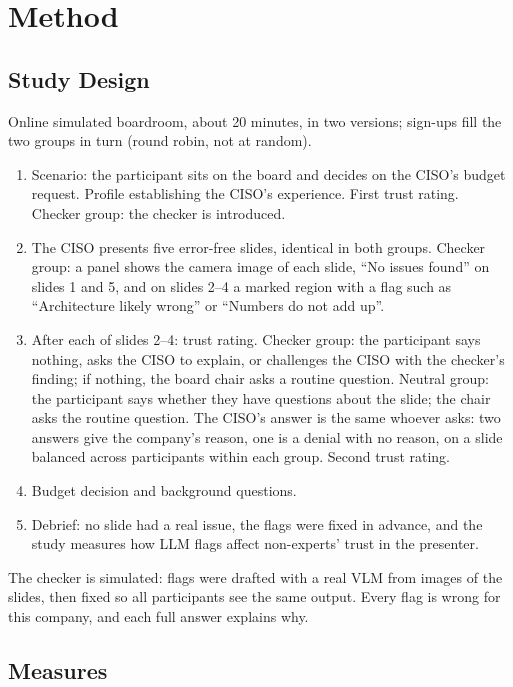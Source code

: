 \documentclass[stu, 12pt]{apa7}
\begin{document}
\section{Method}

\subsection{Study Design}

Online simulated boardroom, about 20 minutes, in two versions; sign-ups fill the two groups in turn (round robin, not at random).

\begin{enumerate}
  \item Scenario: the participant sits on the board and decides on the CISO's budget request. Profile establishing the CISO's experience. First trust rating. Checker group: the checker is introduced.
  \item The CISO presents five error-free slides, identical in both groups. Checker group: a panel shows the camera image of each slide, \enquote{No issues found} on slides 1 and 5, and on slides 2--4 a marked region with a flag such as \enquote{Architecture likely wrong} or \enquote{Numbers do not add up}.
  \item After each of slides 2--4: trust rating. Checker group: the participant says nothing, asks the CISO to explain, or challenges the CISO with the checker's finding; if nothing, the board chair asks a routine question. Neutral group: the participant says whether they have questions about the slide; the chair asks the routine question. The CISO's answer is the same whoever asks: two answers give the company's reason, one is a denial with no reason, on a slide balanced across participants within each group. Second trust rating.
  \item Budget decision and background questions.
  \item Debrief: no slide had a real issue, the flags were fixed in advance, and the study measures how LLM flags affect non-experts' trust in the presenter.
\end{enumerate}

The checker is simulated: flags were drafted with a real VLM from images of the slides, then fixed so all participants see the same output. Every flag is wrong for this company, and each full answer explains why.

\subsection{Measures}
\end{document}
